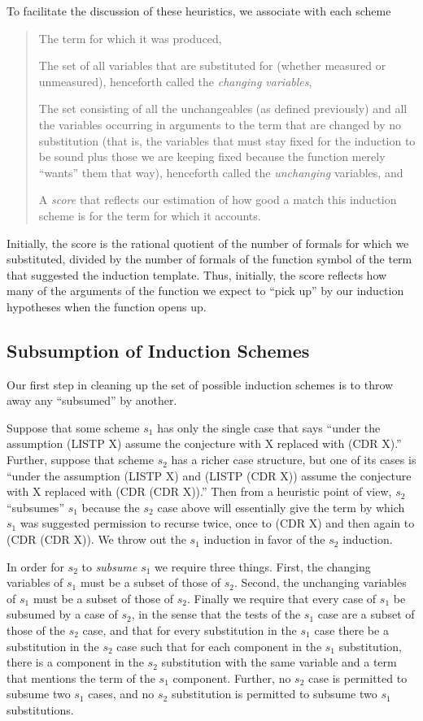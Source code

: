 \documentclass[10pt]{book}
\newenvironment{pubcrown}{\begin{quote}}{\end{quote}}
\begin{document}
To facilitate the discussion of these heuristics,
we associate with each scheme
\begin{pubcrown}
The term for which it was produced,

The set of all variables
that are substituted for (whether measured or unmeasured), henceforth
called the \emph{changing variables},

The set consisting of all the  unchangeables (as defined previously)
and all the variables occurring in arguments to the term that
are changed by no substitution (that is,
the variables that must stay
fixed for the induction to be sound  plus those we are keeping fixed
because the function merely ``wants'' them that way), henceforth
called the \emph{unchanging} variables, and

A \emph{score} that reflects our estimation of how good a match this induction scheme
is for the term for which it accounts.
\end{pubcrown}
Initially, the score
is the rational quotient of the number of formals for which we substituted,
divided by the number of formals of the function symbol of
the term that suggested the induction template.  Thus, initially, the score
reflects how many of the arguments of the function we expect to ``pick up'' by our
induction hypotheses when the function opens up.

\subsection{Subsumption of Induction Schemes}
Our  first step in cleaning up the set of possible
induction schemes is to throw away any ``subsumed'' by another.

Suppose that some
scheme $s_{1}$ has only the single case that says ``under the
assumption (LISTP X) assume the conjecture with X replaced with (CDR X).''
Further, suppose that scheme $s_{2}$ has a richer case structure, but one of
its cases is ``under the assumption (LISTP X) and (LISTP (CDR X))
assume the conjecture with X replaced with (CDR (CDR X)).''  Then from a
heuristic point of view, $s_{2}$ ``subsumes'' $s_{1}$ because the $s_{2}$ case above
will essentially give the term by which $s_{1}$ was suggested permission
to recurse twice, once to (CDR X) and then again to (CDR (CDR X)).
We throw out the $s_{1}$ induction in favor of the $s_{2}$
induction.

In order for $s_{2}$ to \emph{subsume} $s_{1}$ we require three things.  First, the
changing variables of $s_{1}$ must be a subset of those of $s_{2}$.
Second, the unchanging variables of $s_{1}$ must be a subset of those of $s_{2}$.
Finally we require that every case of $s_{1}$ be subsumed by a case of $s_{2}$,
in the sense that the tests of the $s_{1}$ case are a subset of those of the $s_{2}$ case,
and that for every substitution in the $s_{1}$ case there be a substitution in
the $s_{2}$ case such that for each component in the $s_{1}$ substitution, there
is a component in the $s_{2}$ substitution with the same variable and a term
that mentions the term of the $s_{1}$ component.  Further, no $s_{2}$ case
is permitted to subsume two $s_{1}$ cases, and no $s_{2}$ substitution is
permitted to subsume two $s_{1}$ substitutions.
\end{document}
